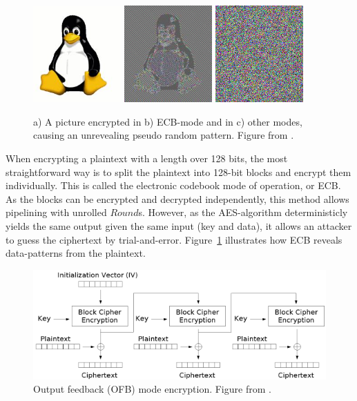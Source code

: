 \begin{figure}[htbb]
  \subfigure{\label{fig:ecbpicta}}
  \includegraphics[width=0.3\textwidth]{tux.jpeg}
  \subfigure{\label{fig:ecbpictb}}
  \includegraphics[width=0.3\textwidth]{tux_ecb.jpeg}
  \subfigure{\label{fig:ecbpictc}}
  \includegraphics[width=0.3\textwidth]{noise.png}
  \caption{a) A picture encrypted in b) ECB-mode and in c) other
    modes, causing an unrevealing pseudo random pattern. Figure from
    \cite{pingu}.}
  \label{fig:ecbpict}
\end{figure}

When encrypting a plaintext with a length over 128 bits, the most
straightforward way is to split the plaintext into 128-bit blocks and
encrypt them individually. This is called the electronic codebook mode
of operation, or ECB. As the blocks can be encrypted and decrypted
independently, this method allows pipelining with unrolled
$Round$s. However, as the AES-algorithm deterministicly yields the
same output given the same input (key and data), it allows an attacker
to guess the ciphertext by trial-and-error. Figure~\ref{fig:ecbpict}
illustrates how ECB reveals data-patterns from the plaintext.


\begin{figure}[htbb]
  \includegraphics{ofb.png}
  \caption{Output feedback (OFB) mode encryption. Figure from \cite{pingu}.}
  \label{fig:ofb}
\end{figure}

